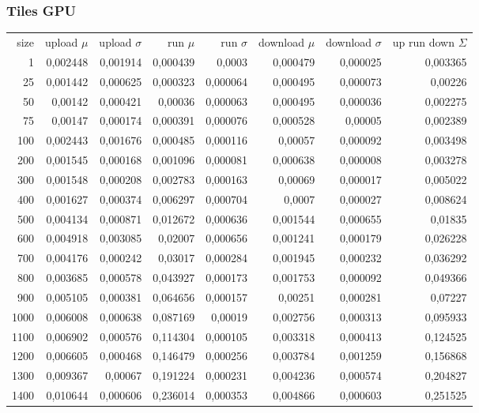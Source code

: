 \subsubsection{Tiles GPU}

\begin{tabular}{r r r r r r r r}
size & upload $\mu$  & upload $\sigma$ & run $\mu$ & run $\sigma$ & download $\mu$ & download $\sigma$ & up run down $\Sigma$ \\
1 & 0,002448 & 0,001914 & 0,000439 & 0,0003 & 0,000479 & 0,000025 & 0,003365 \\
25 & 0,001442 & 0,000625 & 0,000323 & 0,000064 & 0,000495 & 0,000073 & 0,00226 \\
50 & 0,00142 & 0,000421 & 0,00036 & 0,000063 & 0,000495 & 0,000036 & 0,002275 \\
75 & 0,00147 & 0,000174 & 0,000391 & 0,000076 & 0,000528 & 0,00005 & 0,002389 \\
100 & 0,002443 & 0,001676 & 0,000485 & 0,000116 & 0,00057 & 0,000092 & 0,003498 \\
200 & 0,001545 & 0,000168 & 0,001096 & 0,000081 & 0,000638 & 0,000008 & 0,003278 \\
300 & 0,001548 & 0,000208 & 0,002783 & 0,000163 & 0,00069 & 0,000017 & 0,005022 \\
400 & 0,001627 & 0,000374 & 0,006297 & 0,000704 & 0,0007 & 0,000027 & 0,008624 \\
500 & 0,004134 & 0,000871 & 0,012672 & 0,000636 & 0,001544 & 0,000655 & 0,01835 \\
600 & 0,004918 & 0,003085 & 0,02007 & 0,000656 & 0,001241 & 0,000179 & 0,026228 \\
700 & 0,004176 & 0,000242 & 0,03017 & 0,000284 & 0,001945 & 0,000232 & 0,036292 \\
800 & 0,003685 & 0,000578 & 0,043927 & 0,000173 & 0,001753 & 0,000092 & 0,049366 \\
900 & 0,005105 & 0,000381 & 0,064656 & 0,000157 & 0,00251 & 0,000281 & 0,07227 \\
1000 & 0,006008 & 0,000638 & 0,087169 & 0,00019 & 0,002756 & 0,000313 & 0,095933 \\
1100 & 0,006902 & 0,000576 & 0,114304 & 0,000105 & 0,003318 & 0,000413 & 0,124525 \\
1200 & 0,006605 & 0,000468 & 0,146479 & 0,000256 & 0,003784 & 0,001259 & 0,156868 \\
1300 & 0,009367 & 0,00067 & 0,191224 & 0,000231 & 0,004236 & 0,000574 & 0,204827 \\
1400 & 0,010644 & 0,000606 & 0,236014 & 0,000353 & 0,004866 & 0,000603 & 0,251525 \\

\end{tabular}
